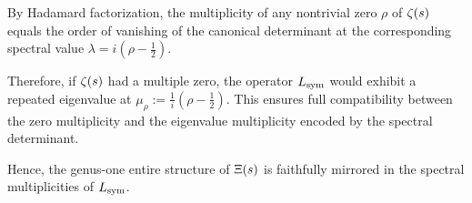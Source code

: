 \begin{remark}
\label{rem:hadamard_multiplicity_preservation}

By Hadamard factorization, the multiplicity of any nontrivial zero \( \rho \) of \( \zeta(s) \) equals the order of vanishing of the canonical determinant at the corresponding spectral value \( \lambda = i(\rho - \tfrac{1}{2}) \).

Therefore, if \( \zeta(s) \) had a multiple zero, the operator \( L_{\mathrm{sym}} \) would exhibit a repeated eigenvalue at \( \mu_\rho := \frac{1}{i}(\rho - \tfrac{1}{2}) \). This ensures full compatibility between the zero multiplicity and the eigenvalue multiplicity encoded by the spectral determinant.

Hence, the genus-one entire structure of \( \Xi(s) \) is faithfully mirrored in the spectral multiplicities of \( L_{\mathrm{sym}} \).
\end{remark}
